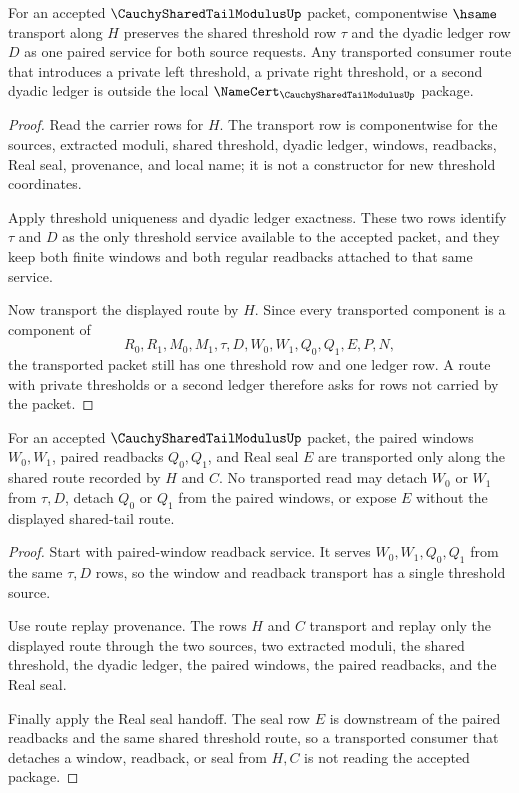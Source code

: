 \begin{theorem}
\label{thm:cauchy-shared-tail-modulus-threshold-transport-stability}
For an accepted $\CauchySharedTailModulusUp$ packet, componentwise $\hsame$ transport along $H$ preserves the shared threshold row $\tau$ and the dyadic ledger row $D$ as one paired service for both source requests. Any transported consumer route that introduces a private left threshold, a private right threshold, or a second dyadic ledger is outside the local $\NameCert_{\CauchySharedTailModulusUp}$ package.
\end{theorem}
\begin{proof}
Read the carrier rows for $H$. The transport row is componentwise for the sources, extracted moduli, shared threshold, dyadic ledger, windows, readbacks, Real seal, provenance, and local name; it is not a constructor for new threshold coordinates.

Apply threshold uniqueness and dyadic ledger exactness. These two rows identify $\tau$ and $D$ as the only threshold service available to the accepted packet, and they keep both finite windows and both regular readbacks attached to that same service.

Now transport the displayed route by $H$. Since every transported component is a component of
$$
R_0,R_1,M_0,M_1,\tau,D,W_0,W_1,Q_0,Q_1,E,P,N,
$$
the transported packet still has one threshold row and one ledger row. A route with private thresholds or a second ledger therefore asks for rows not carried by the packet.
\end{proof}

\begin{theorem}
\label{thm:cauchy-shared-tail-modulus-window-readback-transport}
For an accepted $\CauchySharedTailModulusUp$ packet, the paired windows $W_0,W_1$, paired readbacks $Q_0,Q_1$, and Real seal $E$ are transported only along the shared route recorded by $H$ and $C$. No transported read may detach $W_0$ or $W_1$ from $\tau,D$, detach $Q_0$ or $Q_1$ from the paired windows, or expose $E$ without the displayed shared-tail route.
\end{theorem}
\begin{proof}
Start with paired-window readback service. It serves $W_0,W_1,Q_0,Q_1$ from the same $\tau,D$ rows, so the window and readback transport has a single threshold source.

Use route replay provenance. The rows $H$ and $C$ transport and replay only the displayed route through the two sources, two extracted moduli, the shared threshold, the dyadic ledger, the paired windows, the paired readbacks, and the Real seal.

Finally apply the Real seal handoff. The seal row $E$ is downstream of the paired readbacks and the same shared threshold route, so a transported consumer that detaches a window, readback, or seal from $H,C$ is not reading the accepted package.
\end{proof}

